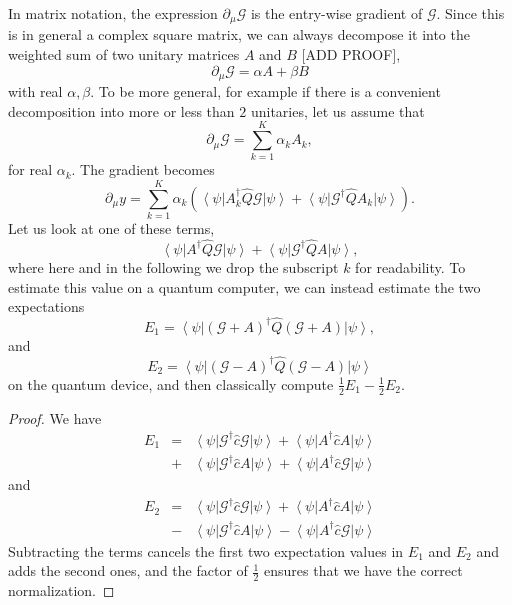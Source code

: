 \documentclass[aps,pra,10pt,twocolumn,groupedaddress,nofootinbib]{revtex4-1}
\theoremstyle{plain}
\newcommand{\ket}[1]{\ensuremath{\left| #1 \right \rangle}}
\newcommand{\bra}[1]{\ensuremath{\left \langle #1 \right |}}
\newcommand{\G}{\mathcal{G}}
\begin{document}
In matrix notation, the expression $\partial_{\mu}\G$ is the entry-wise gradient of $\G$. Since this is in general a complex square matrix, we can always decompose it into the weighted sum of two unitary matrices $A$ and $B$ [ADD PROOF],
\[\partial_{\mu}\G = \alpha A + \beta B \]
with real $\alpha, \beta$. To be more general, for example if there is a convenient decomposition into more or less than $2$ unitaries, let us assume that
\begin{equation} 
	\partial_{\mu}\G = \sum_{k=1}^K \alpha_k A_k, 
	\label{Eq:deriv_decomp}
\end{equation}
for real $\alpha_k$. The gradient becomes
\begin{equation}
	\partial_{\mu} y  = \sum_{k=1}^K \alpha_k  \left( \bra{\psi} A_k^{\dagger}  \hat{Q} \G \ket{\psi} +  \bra{\psi}\G^{\dagger} \hat{Q} A_k  \ket{\psi} \right).
	\label{Eq:gradient_decomp}
\end{equation}
Let us look at one of these terms,
\begin{equation}
	\bra{\psi} A^{\dagger}  \hat{Q} \G \ket{\psi} +  \bra{\psi}\G^{\dagger} \hat{Q} A  \ket{\psi},
\label{Eq:term_to_estimate}
\end{equation}
where here and in the following we drop the subscript $k$ for readability. To estimate this value on a quantum computer, we can instead estimate the two expectations
\begin{equation}
	E_1 = \bra{\psi} (\G + A)^{\dagger} \hat{Q} (\G + A) \ket{\psi},		\label{Eq:E1}
\end{equation}
and
\begin{equation}
	E_2= \bra{\psi}(\G - A)^{\dagger}  \hat{Q} (\G - A) \ket{\psi}
	\label{Eq:E2}
\end{equation}
on the quantum device, and then classically compute $\frac{1}{2}E_1 - \frac{1}{2} E_2$.
\begin{proof}
We have
\begin{eqnarray*}
	E_1 &= &\bra{\psi} \G^{\dagger} \hat{c} \G \ket{\psi} + \bra{\psi} A^{\dagger} \hat{c} A \ket{\psi} \\
	&+& \bra{\psi} \G^{\dagger} \hat{c} A \ket{\psi}+ \bra{\psi} A^{\dagger} \hat{c} \G \ket{\psi}
\end{eqnarray*}
and
\begin{eqnarray*}
	E_2 &= & \bra{\psi} \G^{\dagger} \hat{c} \G \ket{\psi} + \bra{\psi} A^{\dagger} \hat{c} A \ket{\psi} \\
	&-& \bra{\psi} \G^{\dagger} \hat{c} A \ket{\psi}- \bra{\psi} A^{\dagger} \hat{c} \G \ket{\psi}
\end{eqnarray*}
Subtracting the terms cancels the first two expectation values in $E_1$ and $E_2$ and adds the second ones, and the factor of $\frac{1}{2}$ ensures that we have the correct normalization.
\end{proof}
\end{document}
